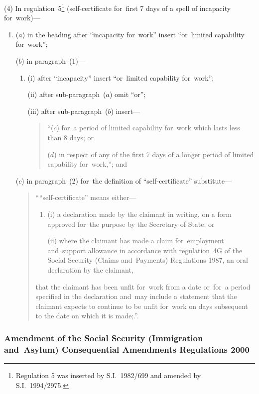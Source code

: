 \documentclass[12pt,a4paper]{article}
\begin{document}
(4) In regulation~5\footnote{Regulation 5 was inserted by S.I.~1982/699 and amended by S.I.~1994/2975.} (self-certificate for~first 7 days of a spell of incapacity for~work)—
\begin{enumerate}\item[]
($a$) in the heading after “incapacity for~work” insert “or~limited capability for~work”;

($b$) in paragraph~(1)—
\begin{enumerate}\item[]
(i) after “incapacity” insert “or~limited capability for~work”;

(ii) after sub-paragraph~($a$)  omit “or”;

(iii) after sub-paragraph~($b$)  insert—
\begin{quotation}
“($c$) for~a period of limited capability for~work which lasts less than 8 days; or

($d$) in respect of any of the first 7 days of a longer period of limited capability for~work,”; and
\end{quotation}
\end{enumerate}

($c$) in paragraph~(2) for~the definition of “self-certificate” substitute—
\begin{quotation}
““self-certificate” means either—
\begin{enumerate}\item[]
(i) 
a declaration made by the claimant in writing, on a form approved for~the purpose by the Secretary of State; or

(ii) 
where the claimant has made a claim for~employment and~support allowance in accordance with regulation~4G of the Social Security (Claims and~Payments) Regulations 1987, an oral declaration by the claimant,
\end{enumerate}
that the claimant has been unfit for~work from a date or~for~a period specified in the declaration and~may include a statement that the claimant expects to continue to be unfit for~work on days subsequent to the date on which it is made;.”.
\end{quotation}
\end{enumerate}

\subsubsection[69. Amendment of the Social Security (Immigration and~Asylum) Consequential Amendments Regulations 2000]{Amendment of the Social Security (Immigration and~Asylum) Consequential Amendments Regulations 2000}
\end{document}
